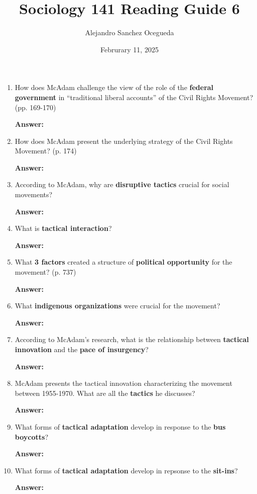\documentclass{article}
\title{Sociology 141 Reading Guide 6}
\author{Alejandro Sanchez Ocegueda}
\date{Februrary 11, 2025}
\newcommand{\answer}{\textbf{Answer:}$\;$}
\begin{document}
\maketitle

\begin{enumerate}[label=\arabic*)]
    \item How does McAdam challenge the view of the role of the \textbf{federal government} in ``traditional liberal accounts'' of the Civil Rights Movement? (pp. 169-170)
    
    \answer 
    
    \item How does McAdam present the underlying strategy of the Civil Rights Movement? (p. 174)
    
    \answer 
    
    
    \item According to McAdam, why are \textbf{disruptive tactics} crucial for social movements?
   

    \answer
    
    \item What is \textbf{tactical interaction}?
    
    \answer 
    
    \item What \textbf{3 factors} created a structure of \textbf{political opportunity} for the movement? (p. 737)
    
    \answer
    

    \item What \textbf{indigenous organizations} were crucial for the movement?
    
    \answer
    
    \item According to McAdam's research, what is the relationship between \textbf{tactical innovation} and the \textbf{pace of insurgency}?
    
    \answer

    \item McAdam presents the tactical innovation characterizing the movement between 1955-1970. 
    What are all the \textbf{tactics} he discusses?
    
    \answer

    \item What forms of \textbf{tactical adaptation} develop in response to the \textbf{bus boycotts}?

    \answer


    \item What forms of \textbf{tactical adaptation} develop in repsonse to the \textbf{sit-ins}?

    \answer


    
\end{enumerate}
 
\end{document}
